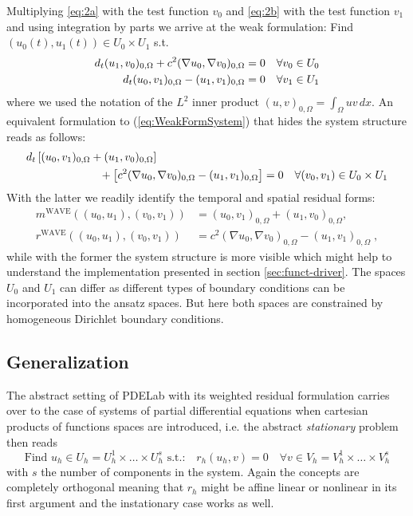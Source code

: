 \documentclass[a4paper,12pt]{article}
\begin{document}
Multiplying \eqref{eq:2a}
with the test function $v_0$ and \eqref{eq:2b} with the test function $v_1$
and using integration by parts we arrive at the weak formulation: Find $(u_0(t),u_1(t))\in
U_0\times U_1$ s.t.
\begin{align}
  d_t (u_1,v_0)_{0,\Omega} + c^2 (\nabla u_0, \nabla v_0)_{0,\Omega} &=
  0 \quad \forall v_0 \in U_0 \notag \\
  d_t (u_0,v_1)_{0,\Omega} - (u_1,v_1)_{0,\Omega} &= 0 \quad \forall
  v_1 \in U_1 \label{eq:WeakFormSystem}
\end{align}
where we used the notation of the $L^2$ inner product $(u,v)_{0,\Omega} = \int_\Omega
u v \, dx$. An equivalent formulation to (\ref{eq:WeakFormSystem}) that
hides the system structure reads as follows:
\begin{equation}
\label{eq:WeakForm}
\begin{split}
d_t &\left[ (u_0,v_1)_{0,\Omega} + (u_1,v_0)_{0,\Omega}\right] \\
&\hspace{20mm}+ \left[ c^2 (\nabla u_0,\nabla v_0)_{0,\Omega} -(u_1,v_1)_{0,\Omega} \right] = 0
\quad \forall (v_0,v_1)\in U_0\times U_1
\end{split}
\end{equation}
With the latter we readily identify the temporal and spatial residual
forms:
\begin{align}
m^{\text{WAVE}}((u_0,u_1),(v_0,v_1)) &= (u_0,v_1)_{0,\Omega} + (u_1,v_0)_{0,\Omega},
\label{eq:TemporalResForm}\\
r^{\text{WAVE}}((u_0,u_1),(v_0,v_1)) &= c^2 (\nabla u_0,\nabla
v_0)_{0,\Omega} - (u_1,v_1)_{0,\Omega} \; , \label{eq:SpatialResForm}
\end{align}
while with the former the system structure is more visible which might
help to understand the implementation presented in section
\ref{sec:funct-driver}.
The spaces $U_0$ and $U_1$ can differ as different types of boundary
conditions can be incorporated into the ansatz spaces. But here both
spaces are constrained by homogeneous Dirichlet boundary conditions.

\subsection*{Generalization}

The abstract setting of PDELab with its weighted residual formulation
carries over to the case of systems of
partial differential equations when cartesian products of
functions spaces are introduced, i.e. the abstract \textit{stationary} problem then reads
\begin{equation}
\text{Find $u_h\in U_h=U_h^1\times \ldots \times U_h^s$ s.t.:} \quad r_h(u_h,v)=0
\quad \forall v\in V_h=V_h^1\times\ldots\times V_h^s
\label{Eq:BasicSystemBuildingBlock}
\end{equation}
with $s$ the number of components in the system. Again the concepts
are completely orthogonal meaning that $r_h$ might be affine linear or nonlinear
in its first argument and the instationary case works as well.
\end{document}
